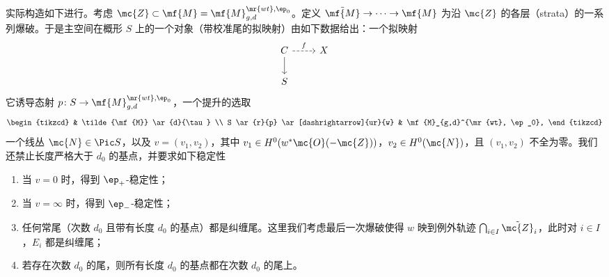 实际构造如下进行。考虑 \(\mc{Z} \subset \mf{M} = \mf{M}_{g,d}^{\mr{wt}, \ep_0}\)。定义 \(\tilde{\mf{M}} \to \cdots \to \mf{M}\) 为沿 \(\mc{Z}\) 的各层（strata）的一系列爆破。于是主空间在概形 \(S\) 上的一个对象（带校准尾的拟映射）由如下数据给出：一个拟映射
\begin{equation*}
\begin{tikzcd}
    C \ar{d} \ar[dashrightarrow]{r}{f} & X \\
    S
\end{tikzcd}
\end{equation*}
它诱导态射 \(p \colon S \to \mf{M}_{g,d}^{\mr{wt}, \ep_0}\)，一个提升的选取
\begin{equation*}
\begin{tikzcd}
    & \tilde{\mf{M}} \ar{d}{\tau} \\
    S \ar{r}{p} \ar[dashrightarrow]{ur}{w} & \mf{M}_{g,d}^{\mr{wt}, \ep_0},
\end{tikzcd}
\end{equation*}
一个线丛 \(\mc{N} \in \Pic S\)，以及 \(v = (v_1, v_2)\)，其中 \(v_1 \in H^0(w^* \mc{O}(-\mc{Z}))\)，\(v_2 \in H^0(\mc{N})\)，且 \((v_1, v_2)\) 不全为零。我们还禁止长度严格大于 \(d_0\) 的基点，并要求如下稳定性
\begin{enumerate}
    \item 当 \(v = 0\) 时，得到 \(\ep_+\)-稳定性；
    \item 当 \(v = \infty\) 时，得到 \(\ep_-\)-稳定性；
    \item 任何常尾（次数 \(d_0\) 且带有长度 \(d_0\) 的基点）都是纠缠尾。这里我们考虑最后一次爆破使得 \(w\) 映到例外轨迹 \(\bigcap_{i \in I} \tilde{\mc{Z}}_i\)，此时对 \(i \in I\)，\(E_i\) 都是纠缠尾；
    \item 若存在次数 \(d_0\) 的尾，则所有长度 \(d_0\) 的基点都在次数 \(d_0\) 的尾上。
\end{enumerate}







